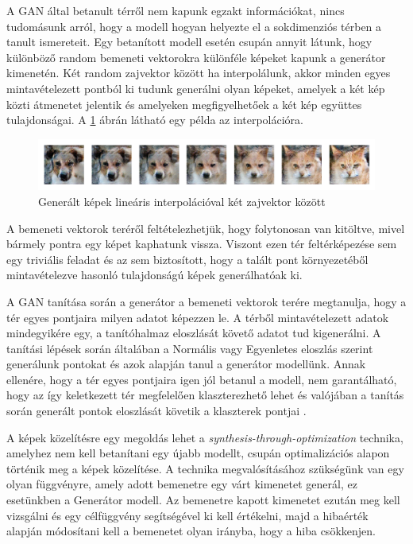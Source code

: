 
A GAN által betanult térről nem kapunk egzakt információkat, nincs tudomásunk arról, hogy a modell hogyan helyezte el a sokdimenziós térben a tanult ismereteit. Egy betanított modell esetén csupán annyit látunk, hogy különböző random bemeneti vektorokra különféle képeket kapunk a generátor kimenetén.
Két random zajvektor között ha interpolálunk, akkor minden egyes mintavételezett pontból ki tudunk generálni olyan képeket, amelyek a két kép közti átmenetet jelentik és amelyeken megfigyelhetőek a két kép együttes tulajdonságai. A \ref{fig:interpolation} ábrán látható egy példa az interpolációra.

\begin{figure}[h]
\centering
\includegraphics[width=15cm]{images/interpolation.png}
\caption{Generált képek lineáris interpolációval két zajvektor között}
\label{fig:interpolation}
\end{figure}

A bemeneti vektorok teréről feltételezhetjük, hogy folytonosan van kitöltve, mivel bármely pontra egy képet kaphatunk vissza. Viszont ezen tér feltérképezése sem egy triviális feladat és az sem biztosított, hogy a talált pont környezetéből mintavételezve hasonló tulajdonságú képek generálhatóak ki.

A GAN tanítása során a generátor a bemeneti vektorok terére megtanulja, hogy a tér egyes pontjaira milyen adatot képezzen le. A térből mintavételezett adatok mindegyikére egy, a tanítóhalmaz eloszlását követő adatot tud kigenerálni.
A tanítási lépések során általában a Normális vagy Egyenletes eloszlás szerint generálunk pontokat és azok alapján tanul a generátor modellünk. Annak ellenére, hogy a tér egyes pontjaira igen jól betanul a modell, nem garantálható, hogy az így keletkezett tér megfelelően klaszterezhető lehet és valójában a tanítás során generált pontok eloszlását követik a klaszterek pontjai \cite{mukherjee2019clustergan}.

A képek közelítésre egy megoldás lehet a \textit{synthesis-through-optimization}\cite{frans2021clipdraw} technika, amelyhez nem kell betanítani egy újabb modellt, csupán optimalizációs alapon történik meg a képek közelítése.
A technika megvalósításához szükségünk van egy olyan függvényre, amely adott bemenetre egy várt kimenetet generál, ez esetünkben a Generátor modell. Az bemenetre kapott kimenetet ezután meg kell vizsgálni és egy célfüggvény segítségével ki kell értékelni, majd a hibaérték alapján módosítani kell a bemenetet olyan irányba, hogy a hiba csökkenjen.

